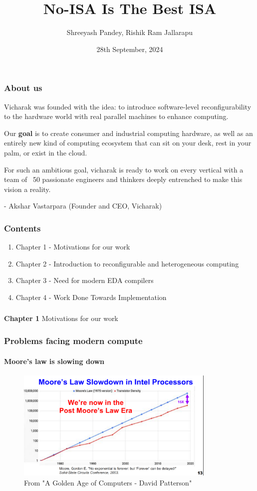 \documentclass{beamer}
\title{No-ISA Is The Best ISA}
\subtitle{}
\author{Shreeyash Pandey, Rishik Ram Jallarapu}
\institute{Vicharak, India @ vicharak.in}
\date{28th September, 2024}
\begin{document}
\begin{frame}
\titlepage
\end{frame}

\begin{frame}[fragile]
\frametitle{About us}

  Vicharak was founded with the idea: to introduce software-level
  reconfigurability to the hardware world with real parallel machines to enhance
  computing. 

  Our \textbf{goal} is to create consumer and industrial
  computing hardware, as well as an entirely new kind of computing ecosystem
  that can sit on your desk, rest in your palm, or exist in the cloud. 

  For such an ambitious goal, vicharak is ready to work on every vertical with
  a team of ~50 passionate engineers and thinkers deeply entrenched to make this
  vision a reality.

  - Akshar Vastarpara (Founder and CEO, Vicharak)

\framesubtitle{}
\end{frame}

\begin{frame}[fragile]
\frametitle{Contents}

  \begin{enumerate}
    \item Chapter 1 - Motivations for our work
    \item Chapter 2 - Introduction to reconfigurable and heterogeneous computing
    \item Chapter 3 - Need for modern EDA compilers
    \item Chapter 4 - Work Done Towards Implementation  
  \end{enumerate}
\end{frame}

\begin{frame}[c,fragile]
  \frametitle{}
  \centering
  \textbf{Chapter 1}
  \centering
  Motivations for our work
\end{frame}

\begin{frame}[fragile]
\frametitle{Problems facing modern compute}
\framesubtitle{Moore's law is slowing down}

  \begin{figure}
    \centering
    \includegraphics[width=0.85\textwidth]{mooreslaw.png}
    \caption{From "A Golden Age of Computers - David Patterson"}
  \end{figure}

\end{frame}
\end{document}
